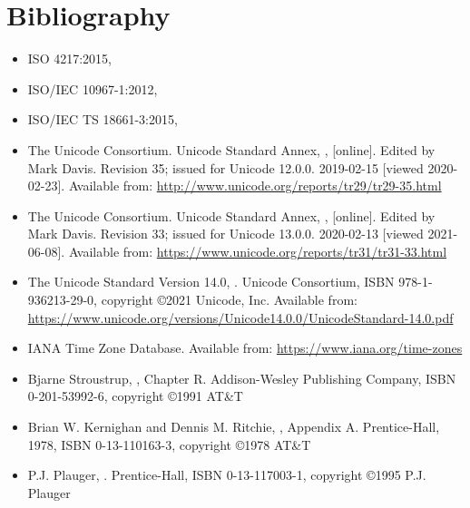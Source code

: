
\chapter{Bibliography}

\begin{itemize}
\renewcommand{\labelitemi}{---}
\item
  ISO 4217:2015,
\item
  ISO/IEC 10967-1:2012,
\item
  ISO/IEC TS 18661-3:2015,
\item
  The Unicode Consortium. Unicode Standard Annex, ,
   [online].
  Edited by Mark Davis. Revision 35; issued for Unicode 12.0.0. 2019-02-15 [viewed 2020-02-23].
  Available from: \url{http://www.unicode.org/reports/tr29/tr29-35.html}
\item
  The Unicode Consortium. Unicode Standard Annex, ,
   [online].
  Edited by Mark Davis. Revision 33; issued for Unicode 13.0.0.
  2020-02-13 [viewed 2021-06-08].
  Available from: \url{https://www.unicode.org/reports/tr31/tr31-33.html}
\item
  The Unicode Standard Version 14.0,
  .
  Unicode Consortium, ISBN 978-1-936213-29-0, copyright \copyright 2021 Unicode, Inc.
  Available from: \url{https://www.unicode.org/versions/Unicode14.0.0/UnicodeStandard-14.0.pdf}
\item
  IANA Time Zone Database.
  Available from: \url{https://www.iana.org/time-zones}
\item
  Bjarne Stroustrup,
  , Chapter R.
  Addison-Wesley Publishing Company, ISBN 0-201-53992-6, copyright \copyright 1991 AT\&T
\item
  Brian W. Kernighan and Dennis M. Ritchie,
  , Appendix A.
  Prentice-Hall, 1978, ISBN 0-13-110163-3, copyright \copyright 1978 AT\&T
\item
  P.J. Plauger,
  .
  Prentice-Hall, ISBN 0-13-117003-1, copyright \copyright 1995 P.J. Plauger
\end{itemize}

